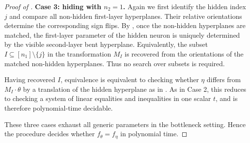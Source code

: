 \documentclass{article}
\theoremstyle{definition}
\begin{document}
\begin{proof}[Proof of ]
\medskip
\noindent
\textbf{Case 3: hiding with $n_2=1$.}
Again we first identify the hidden index $j$ and compare all non-hidden first-layer hyperplanes. Their relative orientations determine the corresponding sign flips. By , once the non-hidden hyperplanes are matched, the first-layer parameter of the hidden neuron is uniquely determined by the visible second-layer bent hyperplane. Equivalently, the subset $I\subseteq[n_1]\setminus\{j\}$ in the transformation $M_I$ is recovered from the orientations of the matched non-hidden hyperplanes. Thus no search over subsets is required.

Having recovered $I$, equivalence is equivalent to checking whether $\eta$ differs from $M_I\cdot\theta$ by a translation of the hidden hyperplane as in . As in Case 2, this reduces to checking a system of linear equalities and inequalities in one scalar $t$, and is therefore polynomial-time decidable.

\medskip
These three cases exhaust all generic parameters in the bottleneck setting. Hence the procedure decides whether $f_\theta=f_\eta$ in polynomial time.
\end{proof}
\corvolumebound*
\end{document}
